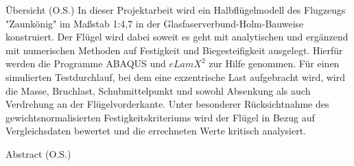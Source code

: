 Übersicht (O.S.)
In dieser Projektarbeit wird ein Halbflügelmodell des Flugzeugs "Zaunkönig" im Maßstab 1:4,7 in der Glasfaserverbund-Holm-Bauweise konstruiert. Der Flügel wird dabei soweit es geht mit analytischen und ergänzend mit numerischen Methoden auf Festigkeit und Biegesteifigkeit ausgelegt. Hierfür werden die Programme ABAQUS und $ eLamX^{2} $ zur Hilfe genommen. Für einen simulierten Testdurchlauf, bei dem eine exzentrische Last aufgebracht wird, wird die Masse, Bruchlast, Schubmittelpunkt und sowohl Absenkung als auch Verdrehung an der Flügelvorderkante. Unter besonderer Rücksichtnahme des gewichtsnormalisierten Festigkeitskriteriums wird der Flügel in Bezug auf Vergleichsdaten bewertet und die errechneten Werte kritisch analysiert.
\newpage

Abstract (O.S.)
